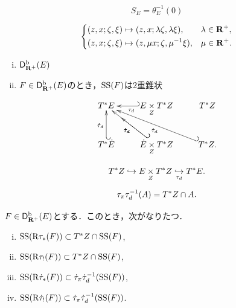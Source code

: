 \begin{equation}
    S_{E}=\theta_{E}^{-1}(0)
\end{equation}

\begin{equation}
    \begin{dcases}
        (z,x;\zeta,\xi)\mapsto (z,x;\lambda\zeta,\lambda\xi),& \lambda\in\rrp,\\
        (z,x;\zeta,\xi)\mapsto (z,\mu x;\zeta,\mu^{-1}\xi),& \mu\in\rrp.
    \end{dcases}
\end{equation}

\begin{leftbar}
\begin{PRP}\label{prp553}
    \begin{enumerate}[(i)]
        \item \(\Dbconic(E)\)
        \item \(F\in\Dbconic(E)\)のとき，\(\muS(F)\)は2重錐状
    \end{enumerate}
\end{PRP}
\end{leftbar}
    
\begin{equation}
    \vcenter{\xymatrix{
        \cotb[E]
        &
        E\pb[Z]\cotb[Z]
        \ar@{_{(}->}[l]-^{\mdiff[\tau]}
        &
        \cotb[Z]\\
        \ar@{_{(}->}[u]-^{\mdiff[\dot{\tau}]}
        \cotb[{\dot{E}}]
        &
        \ar@{_{(}->}[u]-^{\mdiff[\dot{\tau}]}
        \ar@{_{(}->}[l]-^{\mdiff[\dot{\tau}]}
        \dot{E}\pb[Z]\cotb[Z]
        &
        \ar@{_{(}->}[u]-^{\mdiff[\dot{\tau}]}
        \cotb[Z].
    }}
\end{equation}

\begin{equation}
    \cotb[Z]\hookrightarrow
    E\pb[Z]\cotb[Z]
    \underset{\mdiff[\tau]}{\hookrightarrow}
    \cotb[E].
\end{equation}



\begin{equation}
    \mpb[\tau]\mdiff[\tau]^{-1}(A)=\cotb[Z]\cap A.
\end{equation}

\begin{leftbar}
\begin{PRP}
    \(F\in\Dbconic(E)\)とする．このとき，次がなりたつ．
    \begin{enumerate}[(i)]
        \item \(\muS(\Rder{\tau_{\ast}}(F))\subset \cotb[Z]\cap\muS(F)\),
        \item \(\muS(\Rder{\tau_{!}}(F))\subset \cotb[Z]\cap\muS(F)\),
        \item \(\muS(\Rder{\dot{\tau}_{\ast}}(F))\subset \mpb[\dot{\tau}]\mdiff[\dot{\tau}]^{-1}(\muS(F))\),
        \item \(\muS(\Rder{\dot{\tau}_{!}}(F))\subset \mpb[\dot{\tau}]\mdiff[\dot{\tau}]^{-1}(\muS(F))\).
    \end{enumerate}
\end{PRP}
\end{leftbar}


